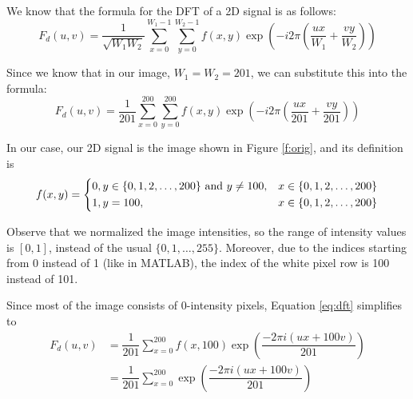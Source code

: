 \documentclass[a4paper]{article}
\begin{document}
We know that the formula for the DFT of a 2D signal is as follows:
\begin{equation*}
F_d(u, v) = \dfrac{1}{\sqrt{W_1W_2}} \sum\limits_{x = 0}^{W_1 - 1} \sum\limits_{y = 0}^{W_2 - 1} f(x, y) \exp\left (-i2\pi \left (\dfrac{ux}{W_1} + \dfrac{vy}{W_2}\right )\right )
\end{equation*}

Since we know that in our image, $W_1 = W_2 = 201$, we can substitute this into the formula:
\begin{equation}
F_d(u, v) = \dfrac{1}{201} \sum\limits_{x = 0}^{200} \sum\limits_{y = 0}^{200} f(x, y) \exp\left (-i2\pi \left (\dfrac{ux}{201} + \dfrac{vy}{201}\right )\right )
\label{eq:dft}
\end{equation}

In our case, our 2D signal is the image shown in Figure \ref{f:orig}, and its definition is
\begin{equation*}
f(x, y) =
\begin{dcases}
0, y \in \{0, 1, 2, \dots, 200\} \text{ and } y \ne 100, & x \in \{0, 1, 2, \dots, 200\} \\
1, y = 100, & x \in \{0, 1, 2, \dots, 200\}
\end{dcases}
\end{equation*}

Observe that we normalized the image intensities, so the range of intensity values is $[0, 1]$, instead of the usual $\{0, 1, \dots, 255\}$. Moreover, due to the indices starting from 0 instead of 1 (like in MATLAB), the index of the white pixel row is 100 instead of 101.

\medskip

Since most of the image consists of 0-intensity pixels, Equation \eqref{eq:dft} simplifies to
\begin{align*}
F_d(u, v) &= \dfrac{1}{201} \sum\limits_{x = 0}^{200} f(x, 100) \exp\left (\dfrac{-2\pi i(ux + 100v)}{201}\right ) \\
&= \dfrac{1}{201} \sum\limits_{x = 0}^{200} \exp\left (\dfrac{-2\pi i(ux + 100v)}{201}\right )
\end{align*}
\end{document}
